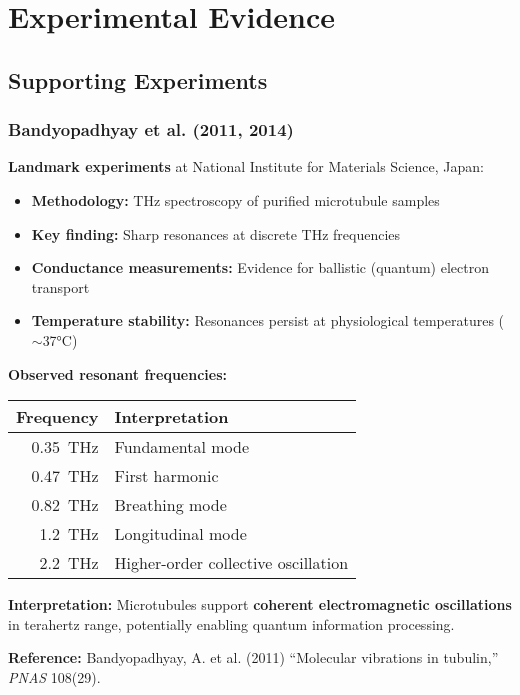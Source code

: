 \section{Experimental Evidence}

\subsection{Supporting Experiments}

\subsubsection{Bandyopadhyay et al. (2011, 2014)}

\textbf{Landmark experiments} at National Institute for Materials Science, Japan:

\begin{itemize}
\item \textbf{Methodology:} THz spectroscopy of purified microtubule samples
\item \textbf{Key finding:} Sharp resonances at discrete THz frequencies
\item \textbf{Conductance measurements:} Evidence for ballistic (quantum) electron transport
\item \textbf{Temperature stability:} Resonances persist at physiological temperatures ($\sim$37°C)
\end{itemize}

\textbf{Observed resonant frequencies:}
\begin{center}
\begin{tabular}{@{}rl@{}}
\toprule
Frequency & Interpretation \\
\midrule
0.35~THz & Fundamental mode \\
0.47~THz & First harmonic \\
0.82~THz & Breathing mode \\
1.2~THz & Longitudinal mode \\
2.2~THz & Higher-order collective oscillation \\
\bottomrule
\end{tabular}
\end{center}

\textbf{Interpretation:} Microtubules support \textbf{coherent electromagnetic oscillations} in terahertz range, potentially enabling quantum information processing.

\textbf{Reference:} Bandyopadhyay, A. et al. (2011) ``Molecular vibrations in tubulin,'' \textit{PNAS} 108(29).

